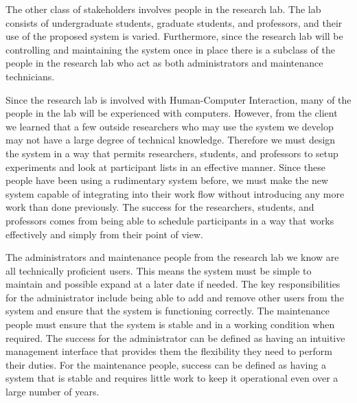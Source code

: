 The other class of stakeholders involves people in the research lab. The lab consists of undergraduate students, graduate students, and professors, and their use of the proposed system is varied. Furthermore, since the research lab will be controlling and maintaining the system once in place there is a subclass of the people in the research lab who act as both administrators and maintenance technicians.

Since the research lab is involved with Human-Computer Interaction, many of the people in the lab will be experienced with computers. However, from the client we learned that a few outside researchers who may use the system we develop may not have a large degree of technical knowledge. Therefore we must design the system in a way that permits researchers, students, and professors to setup experiments and look at participant lists in an effective manner. Since these people have been using a rudimentary system before, we must make the new system capable of integrating into their work flow without introducing any more work than done previously. The success for the researchers, students, and professors comes from being able to schedule participants in a way that works effectively and simply from their point of view.

The administrators and maintenance people from the research lab we know are all technically proficient users. This means the system must be simple to maintain and possible expand at a later date if needed. The key responsibilities for the administrator include being able to add and remove other users from the system and ensure that the system is functioning correctly. The maintenance people must ensure that the system is stable and in a working condition when required. The success for the administrator can be defined as having an intuitive management interface that provides them the flexibility they need to perform their duties. For the maintenance people, success can be defined as having a system that is stable and requires little work to keep it operational even over a large number of years.

